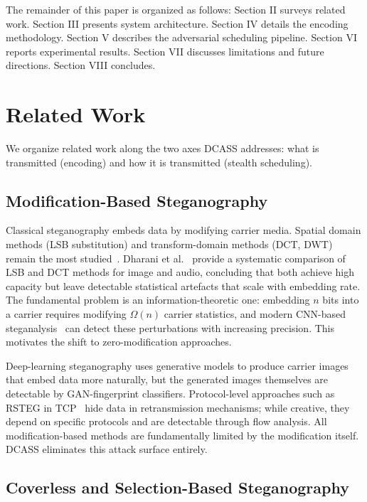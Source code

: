 \documentclass[conference]{IEEEtran}
\begin{document}
The remainder of this paper is organized as follows: Section II surveys related work. Section III presents system architecture. Section IV details the encoding methodology. Section V describes the adversarial scheduling pipeline. Section VI reports experimental results. Section VII discusses limitations and future directions. Section VIII concludes.

\section{Related Work}

We organize related work along the two axes DCASS addresses: what is transmitted (encoding) and how it is transmitted (stealth scheduling).

\subsection{Modification-Based Steganography}

Classical steganography embeds data by modifying carrier media. Spatial domain methods (LSB substitution) and transform-domain methods (DCT, DWT) remain the most studied~\cite{holub2014universal,holub2012designing}. Dharani et al.~\cite{dharani2021comparative} provide a systematic comparison of LSB and DCT methods for image and audio, concluding that both achieve high capacity but leave detectable statistical artefacts that scale with embedding rate. The fundamental problem is an information-theoretic one: embedding $n$ bits into a carrier requires modifying $\Omega(n)$ carrier statistics, and modern CNN-based steganalysis~\cite{boroumand2018deep,zhang2019run,ye2017deep} can detect these perturbations with increasing precision. This motivates the shift to zero-modification approaches.

Deep-learning steganography uses generative models to produce carrier images that embed data more naturally, but the generated images themselves are detectable by GAN-fingerprint classifiers. Protocol-level approaches such as RSTEG in TCP~\cite{szczypiorski2011rsteg} hide data in retransmission mechanisms; while creative, they depend on specific protocols and are detectable through flow analysis. All modification-based methods are fundamentally limited by the modification itself. DCASS eliminates this attack surface entirely.

\subsection{Coverless and Selection-Based Steganography}
\end{document}
